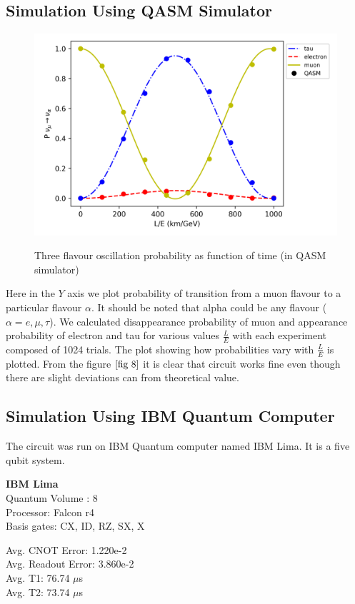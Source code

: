 \documentclass[12pt,a4paper]{report}
\begin{document}
\subsection{Simulation Using QASM Simulator}
\begin{figure}[H]
	\graphicspath{ {./Images/} }	
	{\includegraphics[scale=0.8]{fig_8.png}}
	\centering\caption{ Three flavour oscillation probability as function of time (in QASM simulator)}
		\label{fig 8}
	\end{figure}
Here in the $Y$ axis we plot probability of transition from a muon flavour to a particular flavour $\alpha$. It should be noted that alpha could be any flavour ($\alpha=e,\mu,\tau$). We calculated disappearance probability of muon and appearance probability of electron and tau for various values $\frac{L}{E}$ with each experiment composed of 1024 trials. The plot showing how probabilities vary with $\frac{L}{E}$ is plotted.
	From the figure $\ref{fig 8}$ it is clear that circuit works fine even though there are slight deviations can from theoretical value.
\subsection{Simulation Using IBM Quantum Computer}
The circuit was run on IBM Quantum computer named IBM Lima. It is a five qubit system.\\

\begin{minipage}{0.5\textwidth}
\textbf{IBM Lima}\\	
Quantum Volume : 8 \\
Processor: Falcon r4\\
Basis gates: CX, ID, RZ, SX, X\\
\end{minipage}%
\begin{minipage}{0.5\textwidth}
Avg. CNOT Error: 1.220e-2\\
Avg. Readout Error: 3.860e-2\\
Avg. T1: 76.74 $\mu$s\\
Avg. T2: 73.74 $\mu$s\\

\end{minipage}
\end{document}

